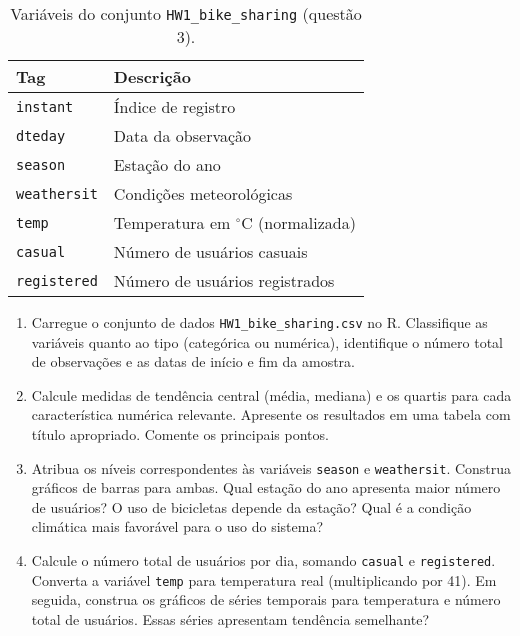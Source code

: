 \documentclass[a4paper,11pt]{article}
\begin{document}
\begin{table}[h] \centering
\begin{tabular}{l | p{6cm} }
{\sc Tag} 		& {\sc Descrição} 							\\ \hline \hline
{\tt instant}     	& Índice de registro                       				\\
{\tt dteday}      	& Data da observação                            			\\
{\tt season}      	& Estação do ano                                			\\
{\tt weathersit}  & Condições meteorológicas                      		\\
{\tt temp}        	& Temperatura em $^\circ$C (normalizada)      	 	\\
{\tt casual}      	& Número de usuários casuais                    		\\
{\tt registered}  	& Número de usuários registrados                		\\
\end{tabular}
\caption{Variáveis do conjunto {\tt HW1\_bike\_sharing} (questão 3).}
\label{tab:ex3}
\end{table}

\vspace{0.5em}
\begin{enumerate}[leftmargin=*]

\item Carregue o conjunto de dados {\tt HW1\_bike\_sharing.csv} no R. Classifique as variáveis quanto ao tipo (categórica ou numérica), identifique o número total de observações e as datas de início e fim da amostra.  

\item Calcule medidas de tendência central (média, mediana) e os quartis para cada característica numérica relevante. Apresente os resultados em uma tabela com título apropriado. Comente os principais pontos.

\item Atribua os níveis correspondentes às variáveis {\tt season} e {\tt weathersit}. Construa gráficos de barras para ambas. Qual estação do ano apresenta maior número de usuários? O uso de bicicletas depende da estação? Qual é a condição climática mais favorável para o uso do sistema?

\item Calcule o número total de usuários por dia, somando {\tt casual} e {\tt registered}. Converta a variável {\tt temp} para temperatura real (multiplicando por 41). Em seguida, construa os gráficos de séries temporais para temperatura e número total de usuários. Essas séries apresentam tendência semelhante?
\end{enumerate}
\\
\end{document}
